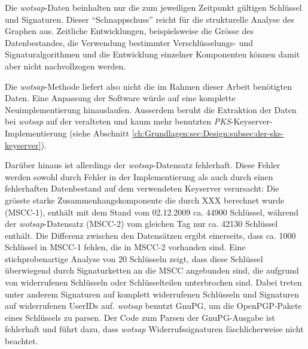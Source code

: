 Die \emph{wotsap}-Daten beinhalten nur die zum jeweiligen Zeitpunkt
gültigen Schlüssel und Signaturen. Dieser "`Schnappschuss"' reicht für
die strukturelle Analyse des Graphen aus. Zeitliche Entwicklungen,
beispielsweise die Grösse des Datenbestandes, die Verwendung
bestimmter Verschlüsselungs- und Signaturalgorithmen und die Entwicklung
einzelner Komponenten können damit aber nicht nachvollzogen werden.

Die \emph{wotsap}-Methode liefert also nicht die im Rahmen dieser
Arbeit benötigten Daten. Eine Anpassung der Software würde auf eine
komplette Neuimplementierung hinauslaufen. Ausserdem beruht die
Extraktion der Daten bei \emph{wotsap} auf der veralteten und kaum
mehr benutzten \emph{PKS}-Keyserver-Implementierung (siehe Abschnitt
\ref{ch:Grundlagen:sec:Design:subsec:der-sks-keyserver}).

Darüber hinaus ist allerdings der \emph{wotsap}-Datensatz
fehlerhaft. Diese Fehler werden sowohl durch Fehler in der
Implementierung als auch durch einen fehlerhaften Datenbestand auf dem
verwendeten Keyserver verursacht: Die grösste starke
Zusammenhangskomponente die durch XXX berechnet %
wurde (MSCC-1), enthält mit dem Stand vom 02.12.2009 ca. 44900
Schlüssel, während der \emph{wotsap}-Datensatz (MSCC-2) vom gleichen
Tag nur ca. 42130 Schlüssel enthält. Die Differenz zwischen den
Datensätzen ergibt einerseits, dass ca. 1000 Schlüssel in MSCC-1
fehlen, die in MSCC-2 vorhanden sind. Eine stichprobenartige Analyse
von 20 Schlüsseln zeigt, dass diese Schlüssel überwiegend durch
Signaturketten an die MSCC angebunden sind, die aufgrund von
widerrufenen Schlüsseln oder Schlüsselteilen unterbrochen sind. Dabei
treten unter anderem Signaturen auf komplett widerrufenen Schlüsseln und
Signaturen auf widerrufenen UserIDs auf. \emph{wotsap} benutzt GnuPG,
um die OpenPGP-Pakete eines Schlüssels zu parsen. Der Code zum Parsen
der GnuPG-Ausgabe ist fehlerhaft und führt dazu, dass \emph{wotsap}
Widerrufssignaturen fäschlicherweise nicht beachtet.


